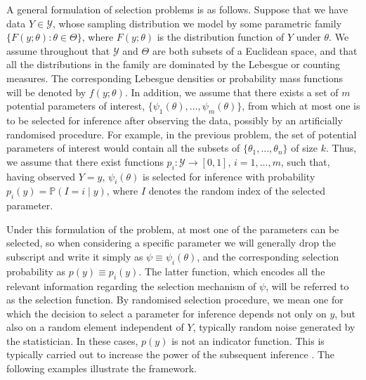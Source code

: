 \documentclass[pdflatex,sn-chicago]{sn-jnl}%
\theoremstyle{thmstyleone}%
\theoremstyle{thmstyletwo}%
\theoremstyle{thmstylethree}%
\begin{document}
A general formulation of selection problems is as follows. Suppose that we have data $Y\in \mathcal{Y}$, whose sampling distribution we model by some parametric family $\{F(y; \theta)\colon \theta\in \Theta \}$, where $F(y; \theta)$ is the distribution function of $Y$ under $\theta$. We assume throughout that $\mathcal{Y}$ and $\Theta$ are both subsets of a Euclidean space, and that all the distributions in the family are dominated by the Lebesgue or counting measures. The corresponding Lebesgue densities or probability mass functions will be denoted by $f(y; \theta)$. In addition, we assume that there exists a set of $m$ potential parameters of interest, $\{\psi_1(\theta), \ldots, \psi_m(\theta)\}$, from which at most one is to be selected for inference after observing the data, possibly by an artificially randomised procedure. For example, in the previous problem, the set of potential parameters of interest would contain all the subsets of $\{\theta_1, \ldots, \theta_n\}$ of size $k$. Thus, we assume that there exist functions $ p_i\colon \mathcal{Y} \to [0, 1]$, $i = 1, \ldots, m$, such that, having observed $Y = y$, $\psi_i(\theta)$ is selected for inference with probability $p_i(y) = \mathbb{P}(I = i\mid y)$, where $I$ denotes the random index of the selected parameter.

Under this formulation of the problem, at most one of the parameters can be selected, so when considering a specific parameter we will generally drop the subscript and write it simply as $\psi \equiv \psi_i(\theta)$, and the corresponding selection probability as $p(y) \equiv p_i(y)$. The latter function, which encodes all the relevant information regarding the selection mechanism of $\psi$, will be referred to as the selection function. By randomised selection procedure, we mean one for which the decision to select a parameter for inference depends not only on $y$, but also on a random element independent of $Y$, typically random noise generated by the statistician. In these cases, $p(y)$ is not an indicator function. This is typically carried out to increase the power of the subsequent inference \citep{tian}. The following examples illustrate the framework.
\end{document}
